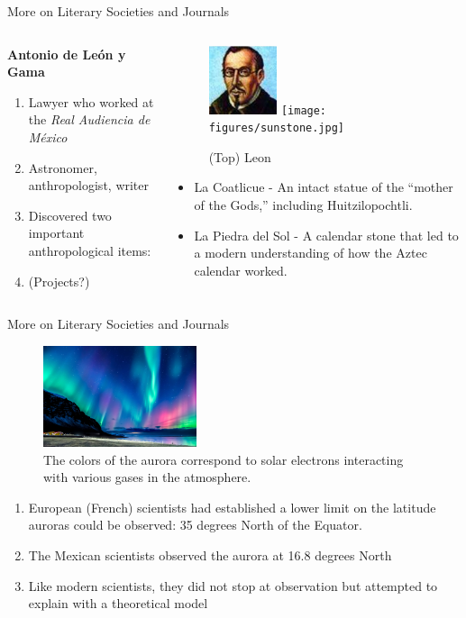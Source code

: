 \documentclass{beamer}
\begin{document}
\begin{frame}[fragile]{More on Literary Societies and Journals}
\small
\begin{columns}
\begin{column}{0.5\textwidth}
\textbf{\alert{Antonio de Le\'{o}n y Gama}}
\begin{enumerate}
\item Lawyer who worked at the \textit{Real Audiencia de M\'{e}xico}
\item Astronomer, anthropologist, writer
\item Discovered two important anthropological items:
\item (Projects?)
\end{enumerate}
\end{column}
\begin{column}{0.5\textwidth}
\begin{figure}
\centering
\includegraphics[width=2cm]{figures/leonygama.jpeg}
\texttt{[image: figures/sunstone.jpg]}
\caption{\label{fig:leon} (Top) Leon}
\end{figure}
\begin{itemize}
\item La Coatlicue - An intact statue of the ``mother of the Gods,'' including Huitzilopochtli.
\item La Piedra del Sol - A calendar stone that led to a modern understanding of how the Aztec calendar worked.
\end{itemize}
\end{column}
\end{columns}
\end{frame}

\begin{frame}{More on Literary Societies and Journals}
\small
\begin{figure}
\includegraphics[width=0.4\textwidth]{figures/ab.jpg}
\caption{The colors of the aurora correspond to solar electrons interacting with various gases in the atmosphere.}
\end{figure}
\begin{enumerate}
\item European (French) scientists had established a lower limit on the latitude auroras could be observed: 35 degrees North of the Equator.
\item The Mexican scientists observed the aurora at 16.8 degrees North
\item Like modern scientists, they did not stop at observation but attempted to explain with a theoretical model
\end{enumerate}
\end{frame}
\end{document}
